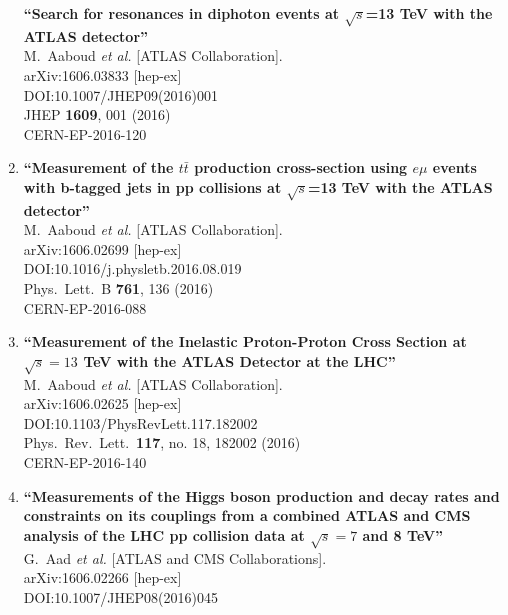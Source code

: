 \documentclass{article}
\begin{document}
\begin{enumerate}
{\bf ``Search for resonances in diphoton events at $\sqrt{s}$=13 TeV with the ATLAS detector''}
  \\{}M.~Aaboud {\it et al.} [ATLAS Collaboration].
  \\{}arXiv:1606.03833 [hep-ex]
  \\{}DOI:10.1007/JHEP09(2016)001
  \\{}JHEP {\bf 1609}, 001 (2016)
  \\{}CERN-EP-2016-120
\item%
{\bf ``Measurement of the $t\bar{t}$ production cross-section using $e\mu$ events with b-tagged jets in pp collisions at $\sqrt{s}$=13 TeV with the ATLAS detector''}
  \\{}M.~Aaboud {\it et al.} [ATLAS Collaboration].
  \\{}arXiv:1606.02699 [hep-ex]
  \\{}DOI:10.1016/j.physletb.2016.08.019
  \\{}Phys.\ Lett.\ B {\bf 761}, 136 (2016)
  \\{}CERN-EP-2016-088
\item%
{\bf ``Measurement of the Inelastic Proton-Proton Cross Section at $\sqrt{s} = 13$  TeV with the ATLAS Detector at the LHC''}
  \\{}M.~Aaboud {\it et al.} [ATLAS Collaboration].
  \\{}arXiv:1606.02625 [hep-ex]
  \\{}DOI:10.1103/PhysRevLett.117.182002
  \\{}Phys.\ Rev.\ Lett.\  {\bf 117}, no. 18, 182002 (2016)
  \\{}CERN-EP-2016-140
\item%
{\bf ``Measurements of the Higgs boson production and decay rates and constraints on its couplings from a combined ATLAS and CMS analysis of the LHC pp collision data at $ \sqrt{s}=7 $ and 8 TeV''}
  \\{}G.~Aad {\it et al.} [ATLAS and CMS Collaborations].
  \\{}arXiv:1606.02266 [hep-ex]
  \\{}DOI:10.1007/JHEP08(2016)045

\end{enumerate}
\end{document}
